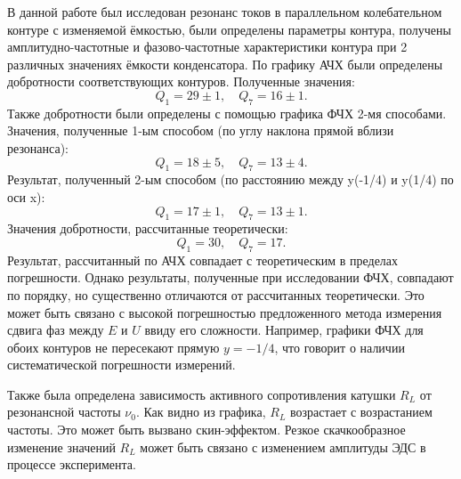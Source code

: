 \documentclass[a4paper, 12pt]{article}
\begin{document}
В данной работе был исследован резонанс токов в параллельном колебательном контуре с изменяемой ёмкостью, были определены параметры контура, получены амплитудно-частотные и фазово-частотные характеристики контура при 2 различных значениях ёмкости конденсатора.  По графику АЧХ были определены добротности соответствующих контуров. Полученные значения:
$$ Q_1 = 29\pm1, \quad Q_7 = 16\pm1. $$
Также добротности были определены с помощью графика ФЧХ 2-мя способами. Значения, полученные 1-ым способом (по углу наклона прямой вблизи резонанса):
$$ Q_1 = 18\pm5, \quad Q_7 = 13\pm4. $$
Результат, полученный 2-ым способом (по расстоянию между y(-1/4) и y(1/4) по оси x):
$$ Q_1 = 17\pm1, \quad Q_7 = 13\pm1. $$
Значения добротности, рассчитанные теоретически:
$$ Q_1 = 30, \quad Q_7 = 17. $$
Результат, рассчитанный по АЧХ совпадает с теоретическим в пределах погрешности. Однако результаты, полученные при исследовании ФЧХ, совпадают по порядку, но существенно отличаются от рассчитанных теоретически. Это может быть связано с высокой погрешностью предложенного метода измерения сдвига фаз между $E$ и $U$ ввиду его сложности. Например, графики ФЧХ для обоих контуров не пересекают прямую $y = -1/4$, что говорит о наличии систематической погрешности измерений.

Также была определена зависимость активного сопротивления катушки $R_L$ от резонансной частоты $\nu_0$. Как видно из графика, $R_L$ возрастает с возрастанием частоты. Это может быть вызвано скин-эффектом. Резкое скачкообразное изменение значений $R_L$ может быть связано с изменением амплитуды ЭДС в процессе эксперимента.
\end{document}

